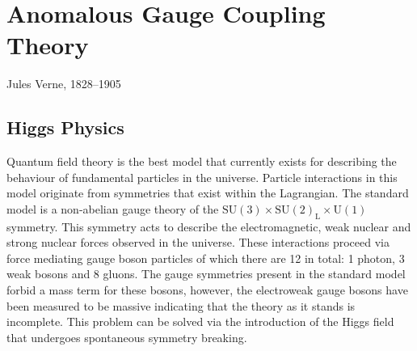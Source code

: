 \chapter{Anomalous Gauge Coupling Theory}
\label{chap:anomalousgaugecouplingtheory}

{Jules Verne, 1828--1905}


\section{Higgs Physics}
Quantum field theory is the best model that currently exists for describing the behaviour of fundamental particles in the universe.  Particle interactions in this model originate from symmetries that exist within the Lagrangian.  The standard model is a non-abelian gauge theory of the $\text{SU}(3) \times \text{SU}(2)_{\text{L}} \times \text{U}(1)$ symmetry.  This symmetry acts to describe the electromagnetic, weak nuclear and strong nuclear forces observed in the universe.  These interactions proceed via force mediating gauge boson particles of which there are 12 in total: 1 photon, 3 weak bosons and 8 gluons.  The gauge symmetries present in the standard model forbid a mass term for these bosons, however, the electroweak gauge bosons have been measured to be massive indicating that the theory as it stands is incomplete.  This problem can be solved via the introduction of the Higgs field that undergoes spontaneous symmetry breaking.


